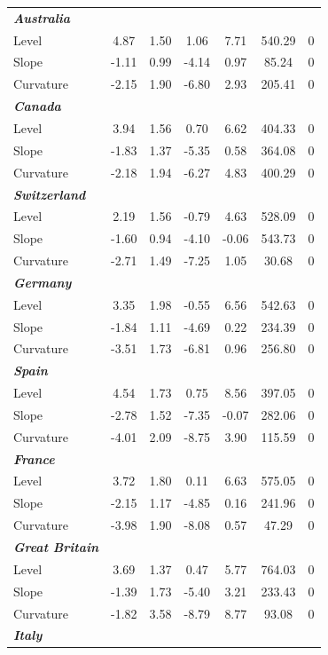 \documentclass[12pt,bibliography=totoc]{article}
\begin{document}
\begin{table}[H]
\begin{tabular}{l c c c c c c}
\textit{\textbf{Australia}}	&		&		&		&		&		&		\\
Level	&	4.87	&	1.50	&	1.06	&	7.71	&	540.29	&	0	\\
Slope	&	-1.11	&	0.99	&	-4.14	&	0.97	&	85.24	&	0	\\
Curvature	&	-2.15	&	1.90	&	-6.80	&	2.93	&	205.41	&	0	\\
\textit{\textbf{Canada}}	&		&		&		&		&		&		\\
Level	&	3.94	&	1.56	&	0.70	&	6.62	&	404.33	&	0	\\
Slope	&	-1.83	&	1.37	&	-5.35	&	0.58	&	364.08	&	0	\\
Curvature	&	-2.18	&	1.94	&	-6.27	&	4.83	&	400.29	&	0	\\
\textit{\textbf{Switzerland}}	&		&		&		&		&		&		\\
Level	&	2.19	&	1.56	&	-0.79	&	4.63	&	528.09	&	0	\\
Slope	&	-1.60	&	0.94	&	-4.10	&	-0.06	&	543.73	&	0	\\
Curvature	&	-2.71	&	1.49	&	-7.25	&	1.05	&	30.68	&	0	\\
\textit{\textbf{Germany}}	&		&		&		&		&		&		\\
Level	&	3.35	&	1.98	&	-0.55	&	6.56	&	542.63	&	0	\\
Slope	&	-1.84	&	1.11	&	-4.69	&	0.22	&	234.39	&	0	\\
Curvature	&	-3.51	&	1.73	&	-6.81	&	0.96	&	256.80	&	0	\\
\textit{\textbf{Spain}}	&		&		&		&		&		&		\\
Level	&	4.54	&	1.73	&	0.75	&	8.56	&	397.05	&	0	\\
Slope	&	-2.78	&	1.52	&	-7.35	&	-0.07	&	282.06	&	0	\\
Curvature	&	-4.01	&	2.09	&	-8.75	&	3.90	&	115.59	&	0	\\
\textit{\textbf{France}}	&		&		&		&		&		&		\\
Level	&	3.72	&	1.80	&	0.11	&	6.63	&	575.05	&	0	\\
Slope	&	-2.15	&	1.17	&	-4.85	&	0.16	&	241.96	&	0	\\
Curvature	&	-3.98	&	1.90	&	-8.08	&	0.57	&	47.29	&	0	\\
\textit{\textbf{Great Britain}}	&		&		&		&		&		&		\\
Level	&	3.69	&	1.37	&	0.47	&	5.77	&	764.03	&	0	\\
Slope	&	-1.39	&	1.73	&	-5.40	&	3.21	&	233.43	&	0	\\
Curvature	&	-1.82	&	3.58	&	-8.79	&	8.77	&	93.08	&	0	\\
\textit{\textbf{Italy}}	&		&		&		&		&		&		\\

\end{tabular}
\end{table}
\end{document}
